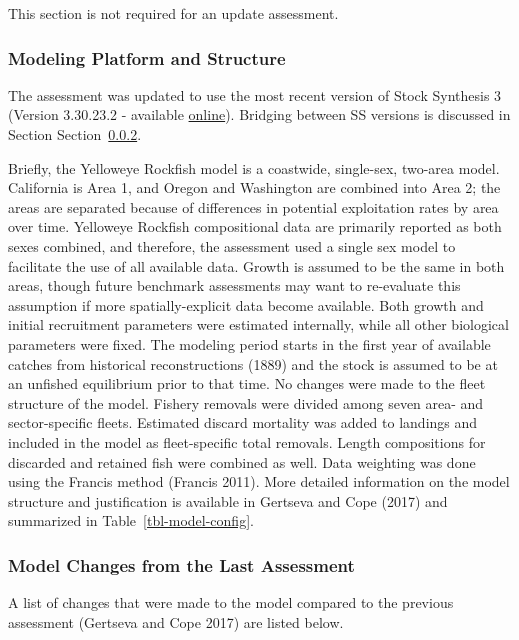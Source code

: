 \documentclass[
]{scrartcl}
\begin{document}
This section is not required for an update assessment.

\subsubsection{Modeling Platform and
Structure}\label{modeling-platform-and-structure}

The assessment was updated to use the most recent version of Stock
Synthesis 3 (Version 3.30.23.2 - available
\href{https://github.com/nmfs-ost/ss3-source-code/releases/tag/v3.30.23.2}{online}).
Bridging between SS versions is discussed in Section
Section~\ref{sec-changes}.

Briefly, the Yelloweye Rockfish model is a coastwide, single-sex,
two-area model. California is Area 1, and Oregon and Washington are
combined into Area 2; the areas are separated because of differences in
potential exploitation rates by area over time. Yelloweye Rockfish
compositional data are primarily reported as both sexes combined, and
therefore, the assessment used a single sex model to facilitate the use
of all available data. Growth is assumed to be the same in both areas,
though future benchmark assessments may want to re-evaluate this
assumption if more spatially-explicit data become available. Both growth
and initial recruitment parameters were estimated internally, while all
other biological parameters were fixed. The modeling period starts in
the first year of available catches from historical reconstructions
(1889) and the stock is assumed to be at an unfished equilibrium prior
to that time. No changes were made to the fleet structure of the model.
Fishery removals were divided among seven area- and sector-specific
fleets. Estimated discard mortality was added to landings and included
in the model as fleet-specific total removals. Length compositions for
discarded and retained fish were combined as well. Data weighting was
done using the Francis method (Francis 2011). More detailed information
on the model structure and justification is available in Gertseva and
Cope (2017) and summarized in Table~\ref{tbl-model-config}.

\subsubsection{Model Changes from the Last
Assessment}\label{sec-changes}

A list of changes that were made to the model compared to the previous
assessment (Gertseva and Cope 2017) are listed below.
\end{document}
